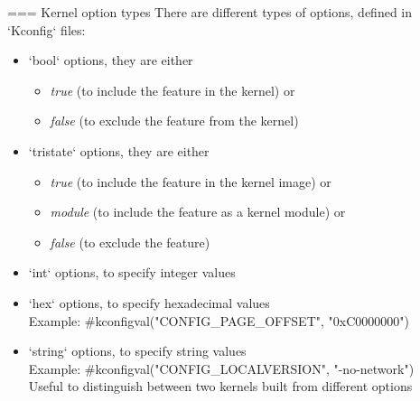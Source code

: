 === Kernel option types
  There are different types of options, defined in `Kconfig` files:
  \begin{itemize}
  \item `bool` options, they are either
    \begin{itemize}
    \item {\em true} (to include the feature in the kernel) or
    \item {\em false} (to exclude the feature from the kernel)
    \end{itemize}
  \item `tristate` options, they are either
    \begin{itemize}
    \item {\em true} (to include the feature in the kernel image) or
    \item {\em module} (to include the feature as a kernel module) or
    \item {\em false} (to exclude the feature)
    \end{itemize}
  \item `int` options, to specify integer values
  \item `hex` options, to specify hexadecimal values\\
    Example: #kconfigval("CONFIG_PAGE_OFFSET", "0xC0000000")
  \item `string` options, to specify string values\\
    Example: #kconfigval("CONFIG_LOCALVERSION", "-no-network")\\
    Useful to distinguish between two kernels built from different options
  \end{itemize}


